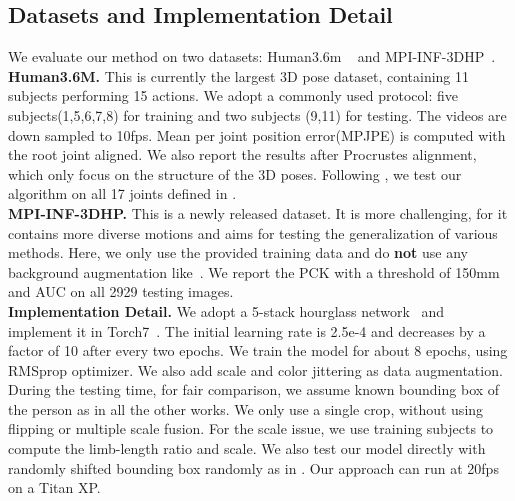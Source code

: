 \documentclass{bmvc2k}
\begin{document}
\subsection{Datasets and Implementation Detail}
We evaluate our method on two datasets: Human3.6m ~\cite{h36m_pami} and MPI-INF-3DHP~\cite{mono-3dhp2017}.\\
\textbf{Human3.6M.} This is currently the largest 3D pose dataset, containing 11 subjects performing 15 actions. We adopt a commonly used protocol: five subjects(1,5,6,7,8) for training and two subjects (9,11) for testing. The videos are down sampled to 10fps. Mean per joint position error(MPJPE) is computed with the root joint aligned. We also report the results after Procrustes alignment, which only focus on the structure of the 3D poses. Following \cite{zhou2016sparseness}, we test our algorithm on all 17 joints defined in \cite{h36m_pami}.\\
\textbf{MPI-INF-3DHP.} This is a newly released dataset. It is more challenging, for it contains more diverse motions and aims for testing the generalization of various methods. Here, we only use the provided training data and do \textbf{not} use any background augmentation like~\cite{mono-3dhp2017,VNect_SIGGRAPH2017}. We report the PCK with a threshold of 150mm and AUC on all 2929 testing images.\\
\textbf{Implementation Detail.}
We adopt a 5-stack hourglass network~\cite{newell2016stacked}  and implement it in Torch7~\cite{collobert2011torch7}. The initial learning rate is 2.5e-4 and decreases by a factor of 10 after every two epochs. We train the model for about 8 epochs, using RMSprop optimizer. We also add scale and color jittering as data augmentation. 
During the testing time, for fair comparison, we assume known bounding box of the person as in all the other works. We only use a single crop, without using flipping or multiple scale fusion. For the scale issue, we use training subjects to compute the limb-length ratio and scale. We also test our model directly with randomly shifted bounding box randomly as in \cite{VNect_SIGGRAPH2017}. Our approach can run at 20fps on a Titan XP. 
\end{document}
